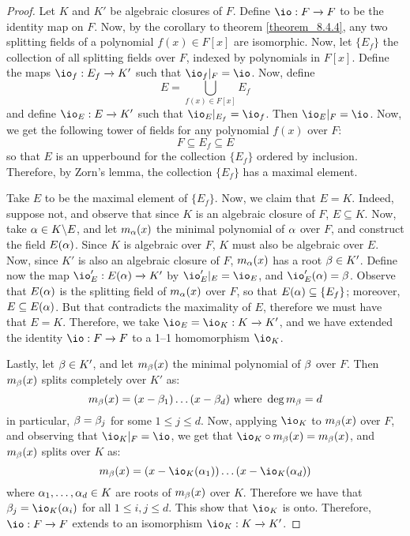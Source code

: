 \begin{proof}
  Let $K$ and $K'$ be algebraic closures of $F$. Define $\io:F
  \xrightarrow{} F$ to be the identity map on $F$. Now, by the
  corollary to theorem \ref{theorem_8.4.4}, any two splitting fields
  of a polynomial $f(x) \in F[x]$ are isomorphic. Now, let $\{E_f\}$
  the collection of all splitting fields over $F$, indexed by
  polynomials in $F[x]$. Define the maps $\io_f:E_f \xrightarrow{} K'$
  such that $\io_f|_F=\io$. Now, define
  \begin{equation*}
    E=\bigcup_{f(x) \in F[x]}{E_f}
  \end{equation*}
  and define $\io_E:E \xrightarrow{} K'$ such that
  $\io_E|_{E_f}=\io_f$. Then $\io_E|_F=\io$. Now, we get the following
  tower of fields for any polynomial $f(x)$ over $F$:
  \begin{equation*}
    F \subseteq E_f \subseteq E
  \end{equation*}
  so that $E$ is an upperbound for the collection $\{E_f\}$ ordered by
  inclusion. Therefore, by Zorn's lemma, the collection $\{E_f\}$ has
  a maximal element.

  Take $E$ to be the maximal element of $\{E_f\}$. Now, we claim that
  $E=K$. Indeed, suppose not, and observe that since $K$ is an
  algebraic closure of $F$, $E \subseteq K$. Now, take $\alpha \in
  K \backslash E$, and let $m_\alpha(x)$ the minimal polynomial of $\alpha$ over
  $F$, and construct the field $E(\alpha)$. Since $K$ is algebraic over
  $F$, $K$ must also be algebraic over $E$. Now, since $K'$ is also an
  algebraic closure of $F$, $m_\alpha(x)$ has a root $\beta \in K'$. Define
  now the map $\io_E':E(\a) \xrightarrow{} K'$ by $\io_E'|_E=\io_E$,
  and $\io_E'(\a)=\b$. Observe that $E(\alpha)$ is the splitting field of
  $m_\alpha(x)$ over $F$, so that $E(\alpha) \subseteq \{E_f\}$; moreover, $E
  \subseteq E(\alpha)$. But that contradicts the maximality of $E$,
  therefore we must have that $E=K$. Therefore, we take
  $\io_E=\io_K:K \xrightarrow{} K'$, and we have extended the
  identity $\io:F \xrightarrow{} F$ to a 1--1 homomorphism $\io_K$.

  Lastly, let $\beta \in K'$, and let $m_\beta(x)$ the minimal polynomial of
  $\beta$ over $F$. Then $m_\beta(x)$ splits completely over $K'$ as:
  \begin{equation*}
    m_\beta(x)=(x-\beta_1) \dots (x-\beta_d) \text{ where } \deg{m_\beta}=d
  \end{equation*}
  in particular, $\beta=\beta_j$ for some $1 \leq j \leq d$. Now, applying
  $\io_K$ to $m_\beta(x)$ over $F$, and observing that $\io_K|_F=\io$, we
  get that $\io_K \circ m_\b(x)=m_\b(x)$, and $m_\beta(x)$ splits over
  $K$ as:
  \begin{equation*}
    m_\b(x)=(x-\io_K(\a_1)) \dots (x-\io_K(\a_d))
  \end{equation*}
  where $\alpha_1, \dots, \alpha_d \in K$ are roots of $m_\beta(x)$ over $K$.
  Therefore we have that $\b_j=\io_K(\a_i)$ for all $1 \leq i,j \leq
  d$. This show that $\io_K$ is onto. Therefore, $\io:F \xrightarrow{}
  F$ extends to an isomorphism $\io_K:K \xrightarrow{} K'$.
\end{proof}

